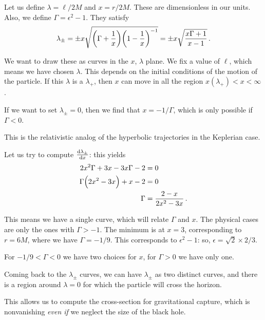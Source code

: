 \documentclass[main.tex]{subfiles}
\begin{document}
Let us define \(\lambda = \ell / 2M\) and \(x = r / 2M\). These are dimensionless in our units. Also, we define \(\Gamma = \epsilon^2- 1\). They satisfy 
%
\begin{align}
\lambda_{\pm} 
= \pm x \sqrt{\qty(\Gamma + \frac{1}{x}) \qty(1 - \frac{1}{x})^{-1}}
= \pm x \sqrt{\frac{x\Gamma + 1}{x-1}}
\,.
\end{align}

We want to draw these as curves in the  \(x\), \(\lambda \) plane. 
We fix a value of \(\ell\), which means we have chosen \(\lambda \). This depends on the initial conditions of the motion of the particle. 
If this \(\lambda \) is a \(\lambda _+\), then \(x\) can move in all the region \(x(\lambda _+)  < x < \infty \).

If we want to set \(\lambda_{\pm}  = 0\), then we find that \(x = - 1 / \Gamma \), which is only possible if \(\Gamma < 0\). 

This is the relativistic analog of the hyperbolic trajectories in the Keplerian case. 

Let us try to compute \(\dv{\lambda_{\pm}}{x}\): this yields 
%
\begin{align}
2 x^2 \Gamma + 3 x - 3 x \Gamma - 2 &= 0 \\
\Gamma \qty(2 x^2 - 3x) + x-2 &= 0  \\
\Gamma &= \frac{2-x}{2 x^2 - 3x}
\,.
\end{align}

This means we have a single curve, which will relate \(\Gamma \) and \(x\). 
The physical cases are only the ones with \(\Gamma > -1\). 
The minimum is at \(x = 3\), corresponding to \(r = 6M\), where we have \(\Gamma = - 1 /9\). This corresponds to \(\epsilon^2 - 1\): so, \(\epsilon = \sqrt{2} \times 2/3 \).

For \(- 1/9 < \Gamma < 0\) we have two choices for \(x\), for \(\Gamma > 0\) we have only one. 

Coming back to the \(\lambda_{\pm}\) curves, we can have \(\lambda_{\pm}\) as two distinct curves, and there is a region around \(\lambda = 0\) for which the particle will cross the horizon. 

This allows us to compute the cross-section for gravitational capture, which is nonvanishing \emph{even if} we neglect the size of the black hole. 
\end{document}
